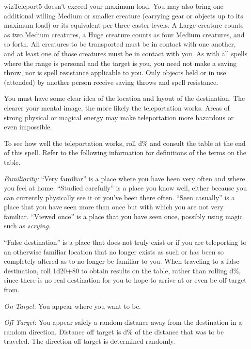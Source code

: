 \begin{spellcard}{wiz}{Teleport}{5}
  doesn't exceed your maximum load. You may also bring one additional
  willing Medium or smaller creature (carrying gear or objects up to its
  maximum load) or its equivalent per three caster levels. A Large
  creature counts as two Medium creatures, a Huge creature counts as four
  Medium creatures, and so forth. All creatures to be transported must be
  in contact with one another, and at least one of those creatures must be
  in contact with you. As with all spells where the range is personal and
  the target is you, you need not make a saving throw, nor is spell
  resistance applicable to you. Only objects held or in use (attended) by
  another person receive saving throws and spell resistance.

  You must have some clear idea of the location and layout of the
  destination. The clearer your mental image, the more likely the
  teleportation works. Areas of strong physical or magical energy may make
  teleportation more hazardous or even impossible.

  To see how well the teleportation works, roll d\% and consult the table
  at the end of this spell. Refer to the following information for
  definitions of the terms on the table.

  \emph{Familiarity:} ``Very familiar'' is a place where you have been very
  often and where you feel at home. ``Studied carefully'' is a place you
  know well, either because you can currently physically see it or you've
  been there often. ``Seen casually'' is a place that you have seen more
  than once but with which you are not very familiar. ``Viewed once'' is a
  place that you have seen once, possibly using magic such as
  \emph{scrying.}

  ``False destination'' is a place that does not truly exist or if you are
  teleporting to an otherwise familiar location that no longer exists as
  such or has been so completely altered as to no longer be familiar to
  you. When traveling to a false destination, roll 1d20+80 to obtain
  results on the table, rather than rolling d\%, since there is no real
  destination for you to hope to arrive at or even be off target from.

  \emph{On Target}: You appear where you want to be.

  \emph{Off Target}: You appear safely a random distance away from the
  destination in a random direction. Distance off target is d\% of the
  distance that was to be traveled. The direction off target is determined
  randomly.


\end{spellcard}
